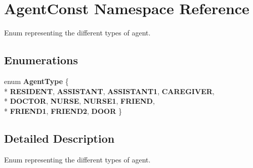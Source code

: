 \hypertarget{namespaceAgentConst}{\section{Agent\-Const Namespace Reference}
\label{namespaceAgentConst}
}


Enum representing the different types of agent.  


\subsection*{Enumerations}
\begin{DoxyCompactItemize}
\item 
enum {\bfseries Agent\-Type} \{ \\*
{\bfseries R\-E\-S\-I\-D\-E\-N\-T}, 
{\bfseries A\-S\-S\-I\-S\-T\-A\-N\-T}, 
{\bfseries A\-S\-S\-I\-S\-T\-A\-N\-T1}, 
{\bfseries C\-A\-R\-E\-G\-I\-V\-E\-R}, 
\\*
{\bfseries D\-O\-C\-T\-O\-R}, 
{\bfseries N\-U\-R\-S\-E}, 
{\bfseries N\-U\-R\-S\-E1}, 
{\bfseries F\-R\-I\-E\-N\-D}, 
\\*
{\bfseries F\-R\-I\-E\-N\-D1}, 
{\bfseries F\-R\-I\-E\-N\-D2}, 
{\bfseries D\-O\-O\-R}
 \}
\end{DoxyCompactItemize}


\subsection{Detailed Description}
Enum representing the different types of agent. 
